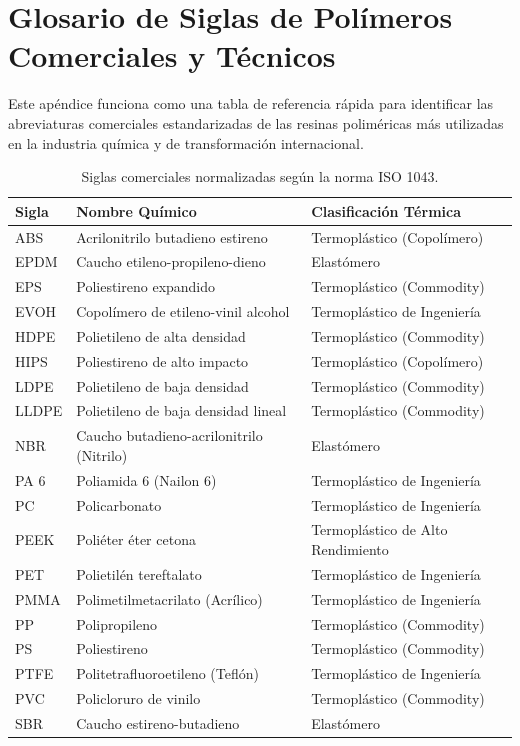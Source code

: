 \chapter{Glosario de Siglas de Polímeros Comerciales y Técnicos}
\label{ap:apendiceB}

Este apéndice funciona como una tabla de referencia rápida para identificar las abreviaturas comerciales estandarizadas de las resinas poliméricas más utilizadas en la industria química y de transformación internacional.

\begin{table}[h]
    \centering
    \caption{Siglas comerciales normalizadas según la norma ISO 1043.}
    \label{tab:glosario_siglas}
    \begin{tabular}{lll}
        \toprule
        \textbf{Sigla} & \textbf{Nombre Químico} & \textbf{Clasificación Térmica} \\
        \midrule
        ABS & Acrilonitrilo butadieno estireno & Termoplástico (Copolímero) \\
        EPDM & Caucho etileno-propileno-dieno & Elastómero \\
        EPS & Poliestireno expandido & Termoplástico (Commodity) \\
        EVOH & Copolímero de etileno-vinil alcohol & Termoplástico de Ingeniería \\
        HDPE & Polietileno de alta densidad & Termoplástico (Commodity) \\
        HIPS & Poliestireno de alto impacto & Termoplástico (Copolímero) \\
        LDPE & Polietileno de baja densidad & Termoplástico (Commodity) \\
        LLDPE & Polietileno de baja densidad lineal & Termoplástico (Commodity) \\
        NBR & Caucho butadieno-acrilonitrilo (Nitrilo) & Elastómero \\
        PA 6 & Poliamida 6 (Nailon 6) & Termoplástico de Ingeniería \\
        PC & Policarbonato & Termoplástico de Ingeniería \\
        PEEK & Poliéter éter cetona & Termoplástico de Alto Rendimiento \\
        PET & Polietilén tereftalato & Termoplástico de Ingeniería \\
        PMMA & Polimetilmetacrilato (Acrílico) & Termoplástico de Ingeniería \\
        PP & Polipropileno & Termoplástico (Commodity) \\
        PS & Poliestireno & Termoplástico (Commodity) \\
        PTFE & Politetrafluoroetileno (Teflón) & Termoplástico de Ingeniería \\
        PVC & Policloruro de vinilo & Termoplástico (Commodity) \\
        SBR & Caucho estireno-butadieno & Elastómero \\
        \bottomrule
    \end{tabular}
\end{table}
